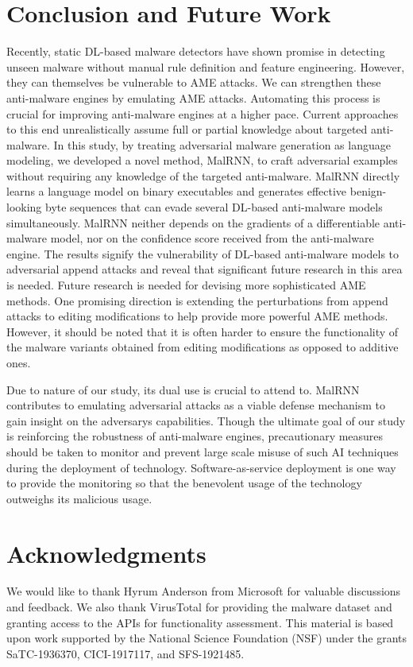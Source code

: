\documentclass[letterpaper]{article}
\begin{document}
\section{Conclusion and Future Work}
Recently, static DL-based malware detectors have shown promise in detecting unseen malware without manual rule definition and feature engineering. However, they can themselves be vulnerable to AME attacks. We can strengthen these anti-malware engines by emulating AME attacks. Automating this process is crucial for improving anti-malware engines at a higher pace. Current approaches to this end unrealistically assume full or partial knowledge about targeted anti-malware. In this study, by treating adversarial malware generation as language modeling, we developed a novel method, MalRNN, to craft adversarial examples without requiring any knowledge of the targeted anti-malware. MalRNN directly learns a language model on binary executables and generates effective benign-looking byte sequences that can evade several DL-based anti-malware models simultaneously. MalRNN neither depends on the gradients of a differentiable anti-malware model, nor on the confidence score received from the anti-malware engine. The results signify the vulnerability of DL-based anti-malware models to adversarial append attacks and reveal that significant future research in this area is needed. Future research is needed for devising more sophisticated AME methods. One promising direction is extending the perturbations from append attacks to editing modifications to help provide more powerful AME methods. However, it should be noted that it is often harder to ensure the functionality of the malware variants obtained from editing modifications as opposed to additive ones. 

Due to nature of our study, its dual use is crucial to attend to. MalRNN contributes to emulating adversarial attacks as a viable defense mechanism to gain insight on the adversarys capabilities. Though the ultimate goal of our study is reinforcing the robustness of anti-malware engines, precautionary measures should be taken to monitor and prevent large scale misuse of such AI techniques during the deployment of technology. Software-as-service deployment is one way to provide the monitoring so that the benevolent usage of the technology outweighs its malicious usage.

\section{ Acknowledgments}
We would like to thank Hyrum Anderson from Microsoft for valuable discussions and feedback. We also thank VirusTotal for providing the malware dataset and granting access to the APIs for functionality assessment.
This material is based upon work supported by the National Science Foundation (NSF) under the grants SaTC-1936370, CICI-1917117, and SFS-1921485.
\end{document}
